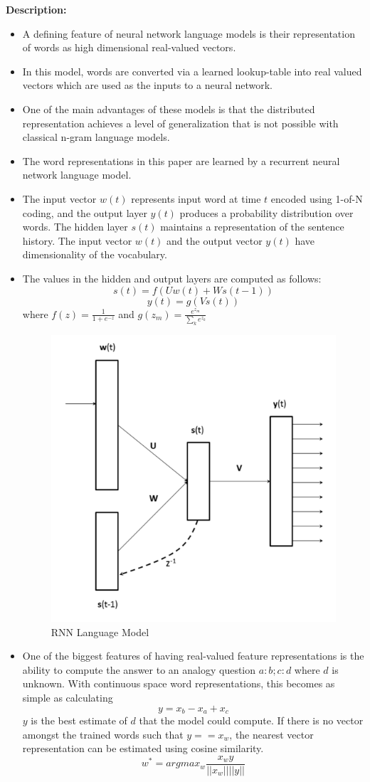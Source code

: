 \documentclass[11pt,a4paper]{article}
\begin{document}
  \textbf{Description:}
  \begin{itemize}
    \item
    A defining feature of neural network language models is their representation of words as high dimensional real-valued vectors.
    \item
    In this model, words are converted via a learned lookup-table into real valued vectors which are used as the inputs to a neural network.
    \item
    One of the main advantages of these models is that the distributed representation achieves a level of generalization that is not possible with classical n-gram language models.
    \item
    The word representations in this paper are learned by a recurrent neural network language model.
    \item
    The input vector $w(t)$ represents input word at time $t$ encoded using 1-of-N coding, and the output layer $y(t)$ produces a probability distribution over words. The hidden layer $s(t)$ maintains a representation of the sentence history. The input vector $w(t)$ and the output vector $y(t)$ have dimensionality of the vocabulary.
    \item
    The values in the hidden and output layers are computed as follows:
    $$s(t) = f(Uw(t) + Ws(t-1))$$
    $$y(t) = g(Vs(t))$$
    where
    $f(z) = \frac{1}{1 + e^{-z}}$ and $g(z_m) = \frac{e^{z_m}}{\sum_k e^{z_k}} $
    \begin{figure}[ht]
      \centering
      \includegraphics[width=.4\textwidth]{rnn-lang-model}
      \caption{RNN Language Model}
      \label{fig:rnn-lang-model}
    \end{figure}
    \item
    One of the biggest features of having real-valued feature representations is the ability to compute the answer to an analogy question $a:b; c:d$ where $d$ is unknown. With continuous space word representations, this becomes as simple as calculating
    $$y = x_b - x_a + x_c$$
    $y$ is the best estimate of $d$ that the model could compute. If there is no vector amongst the trained words such that $y == x_w$, the nearest vector representation can be estimated using cosine similarity.
    $$w^* = argmax_w \frac{x_w y}{||x_w|| ||y||}$$
  \end{itemize}
\end{document}
